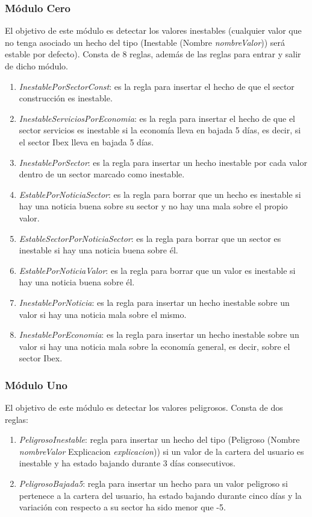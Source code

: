 \documentclass[12pt]{article}
\begin{document}
\subsubsection{Módulo Cero}
El objetivo de este módulo es detectar los valores inestables (cualquier valor que no tenga asociado un hecho del tipo (Inestable (Nombre \textit{nombreValor})) será estable por defecto). Consta de 8 reglas, además de las reglas para entrar y salir de dicho módulo.
\begin{enumerate}
\item \textit{InestablePorSectorConst}: es la regla para insertar el hecho de que el sector construcción es inestable.
\item \textit{InestableServiciosPorEconomia}: es la regla para insertar el hecho de que el sector servicios es inestable si la economía lleva en bajada 5 días, es decir, si el sector Ibex lleva en bajada 5 días.
\item \textit{InestablePorSector}: es la regla para insertar un hecho inestable por cada valor dentro de un sector marcado como inestable.
\item \textit{EstablePorNoticiaSector}: es la regla para borrar que un hecho es inestable si hay una noticia buena sobre su sector y no hay una mala sobre el propio valor.
\item \textit{EstableSectorPorNoticiaSector}: es la regla para borrar que un sector es inestable si hay una noticia buena sobre él.
\item \textit{EstablePorNoticiaValor}: es la regla para borrar que un valor es inestable si hay una noticia buena sobre él.
\item \textit{InestablePorNoticia}: es la regla para insertar un hecho inestable sobre un valor si hay una noticia mala sobre el mismo.
\item \textit{InestablePorEconomia}: es la regla para insertar un hecho inestable sobre un valor si hay una noticia mala sobre la economía general, es decir, sobre el sector Ibex.
\end{enumerate}

\subsubsection{Módulo Uno}
El objetivo de este módulo es detectar los valores peligrosos. Consta de dos reglas:
\begin{enumerate}
\item \textit{PeligrosoInestable}: regla para insertar un hecho del tipo (Peligroso (Nombre \textit{nombreValor} Explicacion \textit{explicacion})) si un valor de la cartera del usuario es inestable y ha estado bajando durante 3 días consecutivos.
\item \textit{PeligrosoBajada5}: regla para insertar un hecho para un valor peligroso si pertenece a la cartera del usuario, ha estado bajando durante cinco días y la variación con respecto a su sector ha sido menor que -5.
\end{enumerate}
\end{document}
